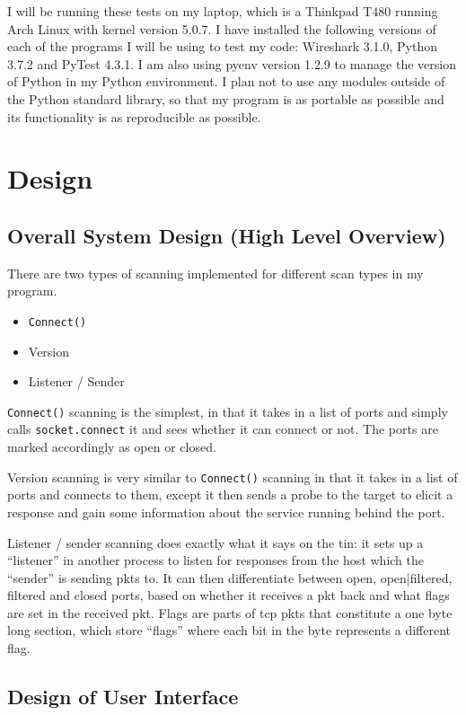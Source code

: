 \documentclass[titlepage]{article}
\let\Oldsection\section{}
\renewcommand{\section}{\clearpage\FloatBarrier\Oldsection}
\let\Oldsubsection\subsection{}
\renewcommand{\subsection}{\FloatBarrier\Oldsubsection}
\begin{document}
I will be running these tests on my laptop, which is a Thinkpad T480 running Arch Linux
with kernel version 5.0.7. I have installed the following versions of each of the programs
I will be using to test my code: Wireshark 3.1.0, Python 3.7.2 and PyTest 4.3.1.
I am also using pyenv version 1.2.9 to manage the version of Python in
my Python environment. I plan not to use any modules outside of the Python standard library,
so that my program is as portable as possible and its functionality is as reproducible as possible.

\section{Design}

\subsection{Overall System Design (High Level Overview)}

There are two types of scanning implemented for different scan types in my program.
\begin{itemize}
  \item{\verb|Connect()|}
  \item{Version}
  \item{Listener / Sender}
\end{itemize}
\verb|Connect()| scanning is the simplest, in that it takes in a list of \glspl{port} and simply 
calls \verb|socket.connect| it and sees whether it can connect or not.
The \glspl{port} are marked accordingly as open or closed. 

Version scanning is very similar to \verb|Connect()| scanning in that it takes in a list of 
\glspl{port} and connects to them, except it then sends a probe to the target to elicit a response 
and gain some information about the \gls{service} running behind the \gls{port}.

Listener / sender scanning does exactly what it says on the tin: it sets up a ``listener'' in 
another process to listen for responses from the host which the ``sender'' is sending \glspl{pkt} 
to. It can then differentiate between open, open|filtered, filtered and closed \glspl{port},
based on whether it receives a \gls{pkt} back and what flags are set in the received \gls{pkt}. 
Flags are parts of \gls{tcp} \glspl{pkt} that constitute a one byte long section,
which store ``flags'' where each bit in the byte represents a different flag.

\subsection{Design of User Interface}
\end{document}
